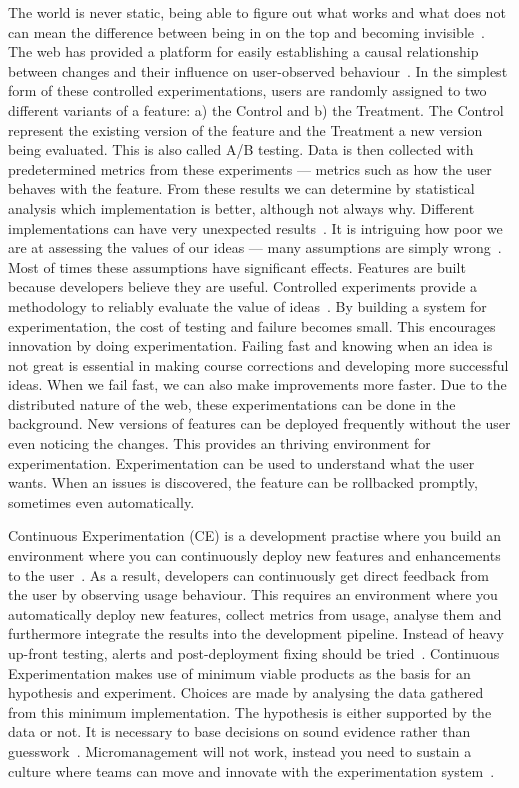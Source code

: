 \documentclass[english]{tktltiki2}
\begin{document}
The world is never static, being able to figure out what works and what does not can mean the difference between being in on the top and becoming invisible~\cite{KLS09}. The web has provided a platform for easily establishing a causal relationship between changes and their influence on user-observed behaviour~\cite{KLS09}. In the simplest form of these controlled experimentations, users are randomly assigned to two different variants of a feature: a) the Control and b) the Treatment. The Control represent the existing version of the feature and the Treatment a new version being evaluated. This is also called A/B testing. Data is then collected with predetermined metrics from these experiments — metrics such as how the user behaves with the feature. From these results we can determine by statistical analysis which implementation is better, although not always why. Different implementations can have very unexpected results~\cite{KLS09, KDF12}. It is intriguing how poor we are at assessing the values of our ideas — many assumptions are simply wrong~\cite{KDF12}. Most of times these assumptions have significant effects. Features are built because developers believe they are useful. Controlled experiments provide a methodology to reliably evaluate the value of ideas~\cite{KLS09}. By building a system for experimentation, the cost of testing and failure becomes small. This encourages innovation by doing experimentation. Failing fast and knowing when an idea is not great is essential in making course corrections and developing more successful ideas. When we fail fast, we can also make improvements more faster. Due to the distributed nature of the web, these experimentations can be done in the background. New versions of features can be deployed frequently without the user even noticing the changes. This provides an thriving environment for experimentation. Experimentation can be used to understand what the user wants. When an issues is discovered, the feature can be rollbacked promptly, sometimes even automatically.

Continuous Experimentation (CE) is a development practise where you build an environment where you can continuously deploy new features and enhancements to the user~\cite{FGM14}. As a result, developers can continuously get direct feedback from the user by observing usage behaviour. This requires an environment where you automatically deploy new features, collect metrics from usage, analyse them and furthermore integrate the results into the development pipeline. Instead of heavy up-front testing, alerts and post-deployment fixing should be tried~\cite{FGM14}. Continuous Experimentation makes use of minimum viable products as the basis for an hypothesis and experiment. Choices are made by analysing the data gathered from this minimum implementation. The hypothesis is either supported by the data or not. It is necessary to base decisions on sound evidence rather than guesswork~\cite{FGM14}. Micromanagement will not work, instead you need to sustain a culture where teams can move and innovate with the experimentation system~\cite{Rie11}.
\end{document}
